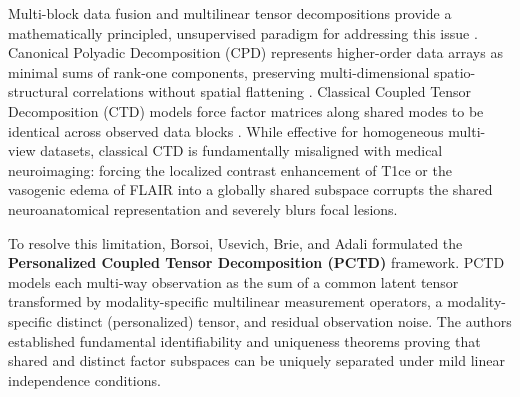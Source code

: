 \documentclass[11pt,a4paper]{article}
\begin{document}
Multi-block data fusion and multilinear tensor decompositions provide a mathematically principled, unsupervised paradigm for addressing this issue \cite{kolda2009tensor, sidiropoulos2017tensor, acar2011coupled}. Canonical Polyadic Decomposition (CPD) represents higher-order data arrays as minimal sums of rank-one components, preserving multi-dimensional spatio-structural correlations without spatial flattening \cite{harshman1970parafac}. Classical Coupled Tensor Decomposition (CTD) models force factor matrices along shared modes to be identical across observed data blocks \cite{acar2011coupled}. While effective for homogeneous multi-view datasets, classical CTD is fundamentally misaligned with medical neuroimaging: forcing the localized contrast enhancement of T1ce or the vasogenic edema of FLAIR into a globally shared subspace corrupts the shared neuroanatomical representation and severely blurs focal lesions.

To resolve this limitation, Borsoi, Usevich, Brie, and Adali \cite{borsoi2024pctd} formulated the \textbf{Personalized Coupled Tensor Decomposition (PCTD)} framework. PCTD models each multi-way observation as the sum of a common latent tensor transformed by modality-specific multilinear measurement operators, a modality-specific distinct (personalized) tensor, and residual observation noise. The authors established fundamental identifiability and uniqueness theorems proving that shared and distinct factor subspaces can be uniquely separated under mild linear independence conditions.
\end{document}
